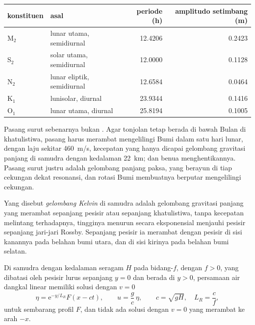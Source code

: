 \begin{center}
\small
\begin{tabular}{llrr}
\hline
konstituen & asal & periode (\unit{h}) & amplitudo setimbang (\unit{m}) \\
\hline
M$_2$ & lunar utama, semidiurnal & \num{12.4206} & \num{0.2423} \\
S$_2$ & solar utama, semidiurnal & \num{12.0000} & \num{0.1128} \\
N$_2$ & lunar eliptik, semidiurnal & \num{12.6584} & \num{0.0464} \\
K$_1$ & lunisolar, diurnal & \num{23.9344} & \num{0.1416} \\
O$_1$ & lunar utama, diurnal & \num{25.8194} & \num{0.1005} \\
\hline
\end{tabular}
\end{center}

Pasang surut sebenarnya bukan . Agar tonjolan tetap berada di bawah Bulan
di khatulistiwa, pasang harus merambat mengelilingi Bumi dalam satu hari lunar,
dengan laju sekitar \qty{460}{m/s}, kecepatan yang hanya dicapai gelombang gravitasi panjang
di samudra dengan kedalaman \qty{22}{km}; dan benua menghentikannya. Pasang surut
justru adalah gelombang panjang paksa, yang berayun di tiap cekungan dekat resonansi, dan
rotasi Bumi membuatnya berputar mengelilingi cekungan.

\begin{definition}\label{def:b3:ocean-dynamics:kelvin-wave}
Yang disebut \emph{gelombang Kelvin} di samudra adalah gelombang gravitasi panjang
yang merambat sepanjang pesisir atau sepanjang khatulistiwa, tanpa kecepatan melintang
terhadapnya, tingginya menurun secara eksponensial menjauhi pesisir sepanjang
jari-jari Rossby. Sepanjang pesisir ia merambat dengan pesisir di sisi kanannya pada
belahan bumi utara, dan di sisi kirinya pada belahan bumi selatan.
\end{definition}

\begin{theorem}\label{thm:b3:ocean-dynamics:kelvin}
Di samudra dengan kedalaman seragam $H$ pada bidang-$f$, dengan $f > 0$, yang dibatasi oleh
pesisir lurus sepanjang $y = 0$ dan berada di $y > 0$, persamaan air dangkal linear
memiliki solusi dengan $v = 0$
\[
\eta = \mathrm e^{-y/L_R}F(x - ct),\qquad u = \frac{g}{c}\,\eta,\qquad
c = \sqrt{gH},\quad L_R = \frac{c}{f},
\]
untuk sembarang profil $F$, dan tidak ada solusi dengan $v = 0$ yang merambat ke arah
$-x$.
\end{theorem}


